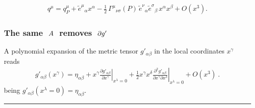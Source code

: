 \documentclass[letterpaper,10pt,english]{jupyterBook}
\begin{document}
\begin{equation*}
\begin{split}
q^\mu=q_P^\mu+\tilde e^\mu{}_\alpha x^\alpha-\tfrac12\,\Gamma^\mu{}_{\nu\sigma}(P)\,\tilde e^\nu{}_\alpha\tilde e^\sigma{}_\beta\,x^\alpha x^\beta+O(x^3).
\end{split}
\end{equation*}\subsubsection*{The same \protect\(\ A \ \protect\) removes \protect\(\ \partial g'\protect\)}

\sphinxAtStartPar
A polynomial expansion of the metric tensor \(g'_{\alpha \beta}\) in the local coordinates \(x^\gamma\) reads
\begin{equation*}
\begin{split}g'_{\alpha \beta}(x^\gamma) = \eta_{\alpha \beta} + x^\gamma \left.\frac{\partial g'_{\alpha \beta}}{\partial x^\gamma}\right|_{x^\lambda = 0} + \frac{1}{2} x^\gamma x^\delta \left. \frac{\partial^2 g'_{\alpha \beta}}{\partial x^\gamma \partial x^\delta} \right|_{x^\lambda=0} + O(x^3) \ .\end{split}
\end{equation*}
\sphinxAtStartPar
being \(g'_{\alpha \beta}(x^\lambda = 0) = \eta_{\alpha \beta}\).


\bigskip\hrule\bigskip
\end{document}
